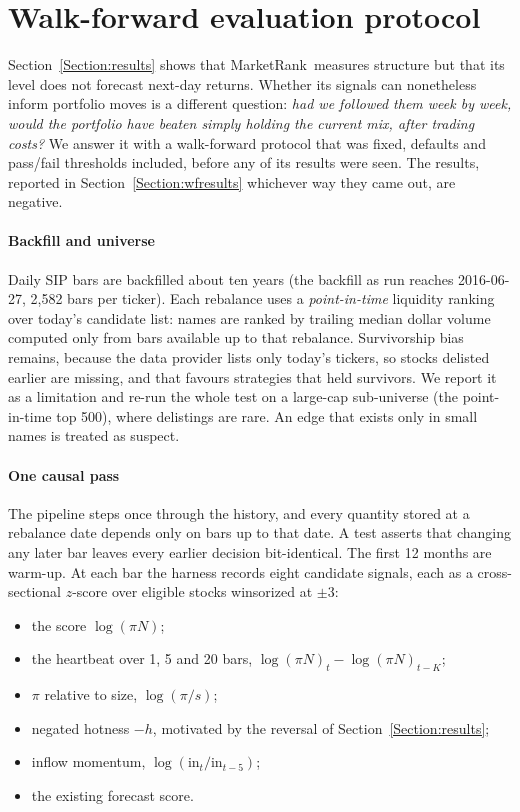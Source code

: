 \documentclass[preprint,3p,twocolumn]{elsarticle}
\newcommand{\MR}{MarketRank}
\begin{document}
\section{Walk-forward evaluation protocol}
\label{Section:wf}

Section~\ref{Section:results} shows that \MR\ measures structure but that its level does not forecast next-day returns. Whether its signals can nonetheless inform portfolio moves is a different question: \emph{had we followed them week by week, would the portfolio have beaten simply holding the current mix, after trading costs?} We answer it with a walk-forward protocol that was fixed, defaults and pass/fail thresholds included, before any of its results were seen. The results, reported in Section~\ref{Section:wfresults} whichever way they came out, are negative.

\paragraph{Backfill and universe} Daily SIP bars are backfilled about ten years (the backfill as run reaches 2016-06-27, 2,582 bars per ticker). Each rebalance uses a \emph{point-in-time} liquidity ranking over today's candidate list: names are ranked by trailing median dollar volume computed only from bars available up to that rebalance. Survivorship bias remains, because the data provider lists only today's tickers, so stocks delisted earlier are missing, and that favours strategies that held survivors. We report it as a limitation and re-run the whole test on a large-cap sub-universe (the point-in-time top 500), where delistings are rare. An edge that exists only in small names is treated as suspect.

\paragraph{One causal pass} The pipeline steps once through the history, and every quantity stored at a rebalance date depends only on bars up to that date. A test asserts that changing any later bar leaves every earlier decision bit-identical. The first 12 months are warm-up. At each bar the harness records eight candidate signals, each as a cross-sectional $z$-score over eligible stocks winsorized at $\pm3$:
\begin{itemize}
\item the score $\log(\pi N)$;
\item the heartbeat over 1, 5 and 20 bars, $\log(\pi N)_t-\log(\pi N)_{t-K}$;
\item $\pi$ relative to size, $\log(\pi/s)$;
\item negated hotness $-h$, motivated by the reversal of Section~\ref{Section:results};
\item inflow momentum, $\log(\mathrm{in}_t/\mathrm{in}_{t-5})$;
\item the existing forecast score.
\end{itemize}
\end{document}
